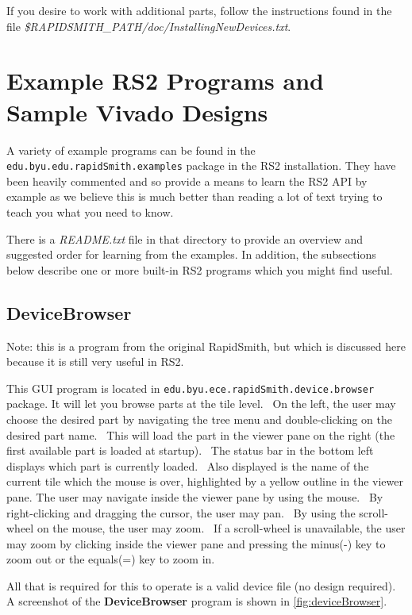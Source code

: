 \documentclass[12pt]{article}
\newcommand{\fil}[1]{{\em #1}}
\newcommand{\pkg}[1]{{\texttt{#1}}}
\newcommand{\pgm}[1]{{\textbf{#1}}}
\begin{document}
If you desire to work with additional parts, follow the instructions found in the
file \fil{\$RAPIDSMITH\_PATH/doc/InstallingNewDevices.txt}.

\section{Example RS2 Programs and Sample Vivado Designs}

A variety of example programs can be found in the
\pkg{edu.byu.edu.rapidSmith.examples} package in the RS2 installation.
They have been heavily commented and so provide a means to learn the RS2 API by
example as we believe this is much better than reading a lot of text trying to
teach you what you need to know.

There is a \fil{README.txt} file in that directory to provide an overview and
suggested order for learning from the examples.
In addition, the subsections below describe one or more built-in RS2 programs
which you might find useful.

\subsection{\pgm{DeviceBrowser}}
Note: this is a program from the original RapidSmith, but which is discussed
here because it is still very useful in RS2. 

This GUI program is located in \pkg{edu.byu.ece.rapidSmith.device.browser}
package.  It will let you browse parts at the tile level.  On the left, the user
may choose the desired part by navigating the tree menu and double-clicking on
the desired part name.  This will load the part in the viewer pane on the right
(the first available part is loaded at startup).  The status bar in the bottom
left displays which part is currently loaded.  Also displayed is the name of the
current tile which the mouse is over, highlighted by a yellow outline in the
viewer pane. The user may navigate inside the viewer pane by using the mouse.
 By right-clicking and dragging the cursor, the user may pan.  By using the
scroll-wheel on the mouse, the user may zoom.  If a scroll-wheel is unavailable,
the user may zoom by clicking inside the viewer pane and pressing the minus(-)
key to zoom out or the equals(=) key to zoom in.

All that is required for this to operate is a valid device file (no design
required). A screenshot of the \pgm{DeviceBrowser} program is shown in
\autoref{fig:deviceBrowser}.
\end{document}
